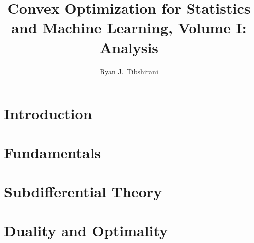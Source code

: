 \documentclass[oneside]{gsm-l} %
\numberwithin{section}{chapter}
\numberwithin{equation}{chapter}
\numberwithin{figure}{chapter}
\begin{document}
\frontmatter

\title{Convex Optimization for Statistics and Machine Learning, Volume I:
  Analysis} 
\author{Ryan J.\ Tibshirani}


\maketitle


\setcounter{page}{5} %
\setcounter{tocdepth}{1} %
\tableofcontents

%

\mainmatter


\part{Introduction}



\part{Fundamentals}




\part{Subdifferential Theory}


 

\part{Duality and Optimality}



\end{document}
